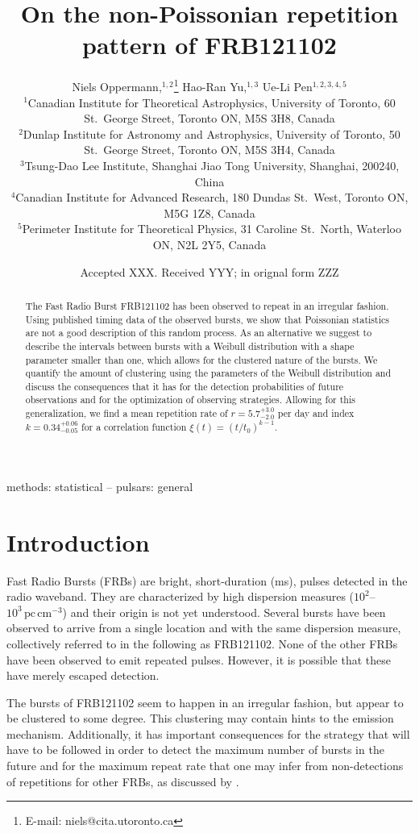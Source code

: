 \documentclass[fleqn,usenatbib]{mnras}
\title{On the non-Poissonian repetition pattern of FRB121102}
\author[N. Oppermann et al.]{Niels Oppermann,$^{1,2}$\thanks{E-mail: niels@cita.utoronto.ca}
Hao-Ran Yu,$^{1,3}$
Ue-Li Pen$^{1,2,3,4,5}$
\\
$^{1}$Canadian Institute for Theoretical Astrophysics, University of Toronto, 60 St.\ George Street, Toronto ON, M5S 3H8, Canada\\
$^{2}$Dunlap Institute for Astronomy and Astrophysics, University of Toronto, 50 St.\ George Street, Toronto ON, M5S 3H4, Canada\\
$^{3}$Tsung-Dao Lee Institute, Shanghai Jiao Tong University, Shanghai, 200240, China\\
$^{4}$Canadian Institute for Advanced Research, 180 Dundas St.\ West, Toronto ON, M5G 1Z8, Canada\\
$^{5}$Perimeter Institute for Theoretical Physics, 31 Caroline St.\ North, Waterloo ON, N2L 2Y5, Canada
}
\date{Accepted XXX. Received YYY; in orignal form ZZZ}
\newcommand{\new}[1]{#1}
\begin{document}
\label{firstpage}
\pagerange{\pageref{firstpage}--\pageref{lastpage}}
\maketitle

\begin{abstract}
	The Fast Radio Burst FRB121102 has been observed to repeat in an irregular fashion. Using published timing data of the observed bursts, we show that Poissonian statistics are not a good description of this random process. As an alternative we suggest to describe the intervals between bursts with a Weibull distribution with a shape parameter smaller than one, which allows for the clustered nature of the bursts. We quantify the amount of clustering using the parameters of the Weibull distribution and discuss the consequences that it has for the detection probabilities of future observations and for the optimization of observing strategies. \new{Allowing for this generalization, we find a mean repetition rate of $r=5.7^{+3.0}_{-2.0}$ per day and index $k=0.34^{+0.06}_{-0.05}$ for a correlation function $\xi(t)=(t/t_0)^{k-1}$}.
\end{abstract}

\begin{keywords}
methods: statistical -- pulsars: general
\end{keywords}


\section{Introduction}
\label{sec:introduction}

Fast Radio Bursts (FRBs) are bright, short-duration (ms), pulses detected in the radio waveband. They are characterized by high dispersion measures ($10^2$--$10^3\,\mathrm{pc}\,\mathrm{cm}^{-3}$) and their origin is not yet understood. Several bursts have been observed to arrive from a single location and with the same dispersion measure, collectively referred to in the following as FRB121102. None of the other FRBs have been observed to emit repeated pulses. However, it is possible that these have merely escaped detection.

The bursts of FRB121102 seem to happen in an irregular fashion, but appear to be clustered to some degree. This clustering may contain hints to the emission mechanism. Additionally, it has important consequences for the strategy that will have to be followed in order to detect the maximum number of bursts in the future and for the maximum repeat rate that one may infer from non-detections of repetitions for other FRBs, as discussed by \citet{connor-2016}.
\end{document}
